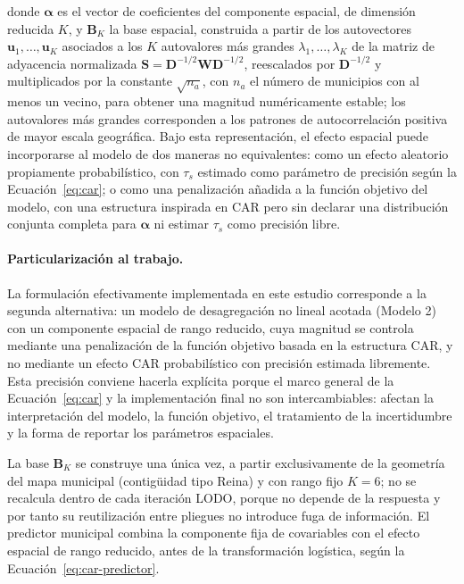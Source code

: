 \noindent donde $\boldsymbol{\alpha}$ es el vector de coeficientes del componente espacial, de dimensión reducida $K$, y $\mathbf{B}_K$ la base espacial, construida a partir de los autovectores $\mathbf{u}_1,\dots,\mathbf{u}_K$ asociados a los $K$ autovalores más grandes $\lambda_1,\dots,\lambda_K$ de la matriz de adyacencia normalizada $\mathbf{S}=\mathbf{D}^{-1/2}\mathbf{W}\mathbf{D}^{-1/2}$, reescalados por $\mathbf{D}^{-1/2}$ y multiplicados por la constante $\sqrt{n_a}$, con $n_a$ el número de municipios con al menos un vecino, para obtener una magnitud numéricamente estable; los autovalores más grandes corresponden a los patrones de autocorrelación positiva de mayor escala geográfica. Bajo esta representación, el efecto espacial puede incorporarse al modelo de dos maneras no equivalentes: como un efecto aleatorio propiamente probabilístico, con $\tau_s$ estimado como parámetro de precisión según la Ecuación~\ref{eq:car}; o como una penalización añadida a la función objetivo del modelo, con una estructura inspirada en CAR pero sin declarar una distribución conjunta completa para $\boldsymbol{\alpha}$ ni estimar $\tau_s$ como precisión libre.

\paragraph{Particularización al trabajo.}
La formulación efectivamente implementada en este estudio corresponde a la segunda alternativa: un modelo de desagregación no lineal acotada (Modelo 2) con un componente espacial de rango reducido, cuya magnitud se controla mediante una penalización de la función objetivo basada en la estructura CAR, y no mediante un efecto CAR probabilístico con precisión estimada libremente. Esta precisión conviene hacerla explícita porque el marco general de la Ecuación~\ref{eq:car} y la implementación final no son intercambiables: afectan la interpretación del modelo, la función objetivo, el tratamiento de la incertidumbre y la forma de reportar los parámetros espaciales.

La base $\mathbf{B}_K$ se construye una única vez, a partir exclusivamente de la geometría del mapa municipal (contigüidad tipo Reina) y con rango fijo $K=6$; no se recalcula dentro de cada iteración LODO, porque no depende de la respuesta y por tanto su reutilización entre pliegues no introduce fuga de información. El predictor municipal combina la componente fija de covariables con el efecto espacial de rango reducido, antes de la transformación logística, según la Ecuación~\ref{eq:car-predictor}.

